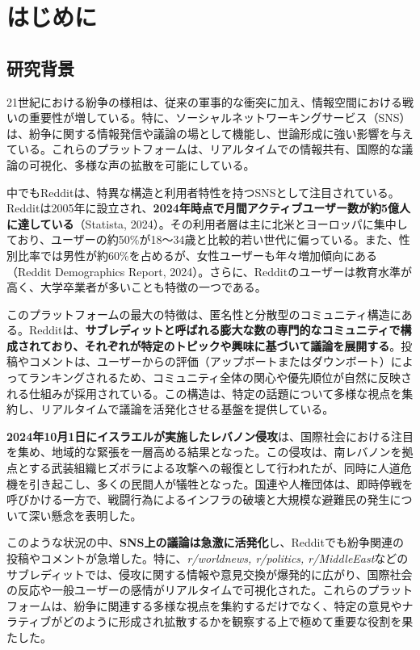 \documentclass[11pt, a4j]{jreport}
\begin{document}
    \chapter{はじめに} %
    \setcounter{page}{1} %

    \section{研究背景}

    21世紀における紛争の様相は、従来の軍事的な衝突に加え、情報空間における戦いの重要性が増している。特に、ソーシャルネットワーキングサービス（SNS）は、紛争に関する情報発信や議論の場として機能し、世論形成に強い影響を与えている。これらのプラットフォームは、リアルタイムでの情報共有、国際的な議論の可視化、多様な声の拡散を可能にしている。

    中でもRedditは、特異な構造と利用者特性を持つSNSとして注目されている。Redditは2005年に設立され、\textbf{2024年時点で月間アクティブユーザー数が約5億人に達している}（Statista, 2024）。その利用者層は主に北米とヨーロッパに集中しており、ユーザーの約50\%が18～34歳と比較的若い世代に偏っている。また、性別比率では男性が約60\%を占めるが、女性ユーザーも年々増加傾向にある（Reddit Demographics Report, 2024）。さらに、Redditのユーザーは教育水準が高く、大学卒業者が多いことも特徴の一つである。

    このプラットフォームの最大の特徴は、匿名性と分散型のコミュニティ構造にある。Redditは、\textbf{サブレディットと呼ばれる膨大な数の専門的なコミュニティで構成されており、それぞれが特定のトピックや興味に基づいて議論を展開する}。投稿やコメントは、ユーザーからの評価（アップボートまたはダウンボート）によってランキングされるため、コミュニティ全体の関心や優先順位が自然に反映される仕組みが採用されている。この構造は、特定の話題について多様な視点を集約し、リアルタイムで議論を活発化させる基盤を提供している。

    \textbf{2024年10月1日にイスラエルが実施したレバノン侵攻}は、国際社会における注目を集め、地域的な緊張を一層高める結果となった。この侵攻は、南レバノンを拠点とする武装組織ヒズボラによる攻撃への報復として行われたが、同時に人道危機を引き起こし、多くの民間人が犠牲となった。国連や人権団体は、即時停戦を呼びかける一方で、戦闘行為によるインフラの破壊と大規模な避難民の発生について深い懸念を表明した。

    このような状況の中、\textbf{SNS上の議論は急激に活発化}し、Redditでも紛争関連の投稿やコメントが急増した。特に、\textit{r/worldnews, r/politics, r/MiddleEast}などのサブレディットでは、侵攻に関する情報や意見交換が爆発的に広がり、国際社会の反応や一般ユーザーの感情がリアルタイムで可視化された。これらのプラットフォームは、紛争に関連する多様な視点を集約するだけでなく、特定の意見やナラティブがどのように形成され拡散するかを観察する上で極めて重要な役割を果たした。
\end{document}
